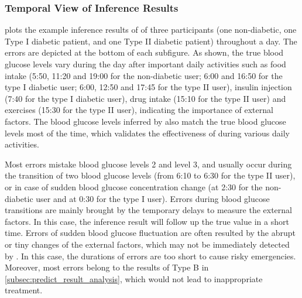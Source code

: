 \subsubsection{Temporal View of Inference Results}
 plots the example inference results of \sysname of three participants (one non-diabetic, one Type I diabetic patient, and one Type II diabetic patient) throughout a day.
The errors are depicted at the bottom of each subfigure.
As shown, the true blood glucose levels vary during the day after important daily activities such as food intake (5:50, 11:20 and 19:00 for the non-diabetic user; 6:00 and 16:50 for the type I diabetic user; 6:00, 12:50 and 17:45 for the type II user), insulin injection (7:40 for the type I diabetic user), drug intake (15:10 for the type II user) and exercises (15:30 for the type II user), indicating the importance of external factors.
The blood glucose levels inferred by \sysname also match the true blood glucose levels most of the time, which validates the effectiveness of \sysname during various daily activities.

Most errors mistake blood glucose levels 2 and level 3, and usually occur during the transition of two blood glucose levels (\eg from 6:10 to 6:30 for the type II user), or in case of sudden blood glucose concentration change (\eg at 2:30 for the non-diabetic user and at 0:30 for the type I user).
Errors during blood glucose transitions are mainly brought by the temporary delays to measure the external factors. In this case, the inference result will follow up the true value in a short time.
Errors of sudden blood glucose fluctuation are often resulted by the abrupt or tiny changes of the external factors,
which may not be immediately detected by \sysname. In this case, the durations of errors are too short to cause risky emergencies. Moreover, most errors belong to the results of Type B in \ref{subsec:predict_result_analysis}, which would not lead to inappropriate treatment.



